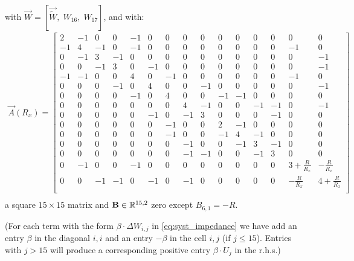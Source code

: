 \begin{problem}
\begin{subproblem}[3]
\begin{solution}
\[   \]
   with $\vec{W} = [\vec{\tilde{W}}, \; W_{16}, \; W_{17}]$, and with:
   \setcounter{MaxMatrixCols}{20}
   \begin{align*}
    \vec{A}(R_x) = \begin{bmatrix} 
      2 & -1 & 0 & 0 & -1 & 0 & 0 & 0 & 0 & 0 & 0 & 0 & 0 & 0 & 0 \\
      -1 & 4 & -1 & 0 & -1 & 0 & 0 & 0 & 0 & 0 & 0 & 0 & 0 & -1 & 0 \\
      0 & -1 & 3 & -1 & 0 & 0 & 0 & 0 & 0 & 0 & 0 & 0 & 0 & 0 & -1 \\
      0 & 0 & -1 & 3 & 0 & -1 & 0 & 0 & 0 & 0 & 0 & 0 & 0 & 0 & -1 \\
      -1 & -1 & 0 & 0 & 4 & 0 & -1 & 0 & 0 & 0 & 0 & 0 & 0 & -1 & 0 \\
      0 & 0 & 0 & -1 & 0 & 4 & 0 & 0 & -1 & 0 & 0 & 0 & 0 & 0 & -1 \\
      0 & 0 & 0 & 0 & -1 & 0 & 4 & 0 & 0 & -1 & -1 & 0 & 0 & 0 & 0 \\
      0 & 0 & 0 & 0 & 0 & 0 & 0 & 4 & -1 & 0 & 0 & -1 & -1 & 0 & -1 \\
      0 & 0 & 0 & 0 & 0 & -1 & 0 & -1 & 3 & 0 & 0 & 0 & -1 & 0 & 0 \\
      0 & 0 & 0 & 0 & 0 & 0 & -1 & 0 & 0 & 2 & -1 & 0 & 0 & 0 & 0 \\
      0 & 0 & 0 & 0 & 0 & 0 & -1 & 0 & 0 & -1 & 4 & -1 & 0 & 0 & 0 \\
      0 & 0 & 0 & 0 & 0 & 0 & 0 & -1 & 0 & 0 & -1 & 3 & -1 & 0 & 0 \\
      0 & 0 & 0 & 0 & 0 & 0 & 0 & -1 & -1 & 0 & 0 & -1 & 3 & 0 & 0 \\
      0 & -1 & 0 & 0 & -1 & 0 & 0 & 0 & 0 & 0 & 0 & 0 & 0 & 3 + \frac{R}{R_x} & -\frac{R}{R_x} \\
      0 & 0 & -1 & -1 & 0 & -1 & 0 & -1 & 0 & 0 & 0 & 0 & 0 & -\frac{R}{R_x} & 4 + \frac{R}{R_x} \\
        \end{bmatrix} \\
   \end{align*}
    a square $15 \times 15$ matrix and $\mathbf{B} \in \mathbb{R}^{15,2}$ zero except $B_{6,1} = -R$.

   (For each term with the form $\beta \cdot \Delta W_{i,j}$ in \eqref{eq:syst_impedance} we have add an entry $\beta$ in the diagonal $i,i$ and an entry $-\beta$ in the cell $i,j$ (if $j \leq 15$). Entries with $j > 15$ will produce a corresponding positive entry $\beta \cdot U_j$ in the r.h.s.)
  \end{solution}


\end{subproblem}
\end{problem}
